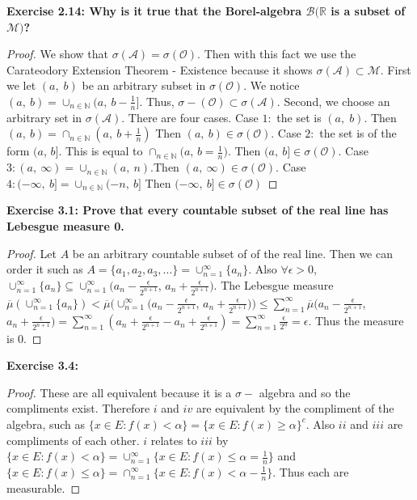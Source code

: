 \documentclass[letterpaper,12pt]{article}
\theoremstyle{definition}
\begin{document}
\noindent\textbf{ Exercise 2.14:
Why is it true that the Borel-algebra $\mathcal{B}(\mathbb{R}$ is a subset of $\mathcal{M})$?}
\begin{proof}
We show that $\sigma(\mathcal{A}) = \sigma(\mathcal{O})$.  Then with this fact we use the Carateodory Extension Theorem - Existence because it shows $\sigma(\mathcal{A}) \subset \mathcal{M}$.  First we let $(a,\;b)$ be an arbitrary subset in
 $\sigma(\mathcal{O})$.  We notice $(a, \:b) = \cup_{n \in \mathbb{N}}(a, \: b - \frac{1}{n}]$.  Thus, $\sigma-(\mathcal{O}) 
\subset \sigma(\mathcal{A})$.  Second, we choose an arbitrary set in $\sigma(\mathcal{A})$.  There are four cases.  Case 
$1:$ the set is $(a,\;b)$.  Then $(a,\:b) = \cap_{n \in \mathbb{N}}(a,\: b + \frac{1}{n})$ Then $(a, \:b) \in \sigma(\mathcal{O})$.  
Case $2:$ the set is of the form $(a$, $b]$.  This is equal to $ \cap_{n\in\mathbb{N}}(a$, $b = \frac{1}{n})$. Then $(a, \:b] \in \sigma(\mathcal{O})$. Case$3: (a,\:\infty) = \cup_{n\in\mathbb{N}}(a, \:n)$.Then $(a, \:\infty) \in \sigma(\mathcal{O})$. Case $4: (-\infty,\:b] = \cup_{n\in\mathbb{N}} (-n,\:b]$ Then $(-\infty, \:b] \in \sigma(\mathcal{O})$
\end{proof}

\noindent\textbf{ Exercise 3.1:
Prove that every countable subset of the real line has Lebesgue measure 0.}
\begin{proof}
Let $A$ be an arbitrary countable subset of of the real line.  Then we can order it such as $A = \{ a_1, a_2, a_3, \dots \} = \cup^{\infty}_{n=1} \{ a_n\}$.  Also $\forall \epsilon >  0$, $ \cup^{\infty}_{n=1} \{a_n\}  \subseteq \cup^{\infty}_{n=1}(a_n-\frac{\epsilon}{2^{n+1}}$, $a_n + \frac{\epsilon}{2^{n+1}})$.  The Lebesgue measure $\overline{\mu}(\cup_{n=1}^{\infty} \{a_n\}) < \overline{\mu}(\cup_{n=1}^{\infty} (a_n - \frac{\epsilon}{2^{n+1}}$, $a_n + \frac{\epsilon}{2^{n+1}} )) \leq \sum^{\infty}_{n=1} \overline{\mu} (a_n - \frac{\epsilon}{2^{n+1}}$, $a_n + \frac{\epsilon}{2^{n+1}} ) = \sum^{\infty}_{n=1} (a_n + \frac{\epsilon}{2^{n+1}} - a_n + \frac{\epsilon}{2^{n+1}}) = \sum^{\infty}_{n=1} \frac{\epsilon}{2^n} = \epsilon$.  Thus the measure is $0$.

\end{proof}

\noindent\textbf{ Exercise 3.4:}
\begin{proof}
 These are all equivalent because it is a $\sigma-$ algebra and so the compliments exist.  Therefore $i$ and $iv$ are equivalent by the compliment of the algebra, such as $\{ x \in E : f(x) < \alpha \} = \{ x \in E : f(x) \geq \alpha \}^c$.  Also $ii$ and $iii$ are compliments of each other. $i$ relates to $iii$ by $\{ x \in E : f(x) < \alpha \} = \cup^{\infty}_{n=1} \{ x \in E : f(x) \leq \alpha = \frac{1}{n} \}$ and $\{ x \in E : f(x) \leq \alpha \} = \cap_{n=1}^{\infty} \{ x \in E : f(x) < \alpha - \frac{1}{n} \}$. Thus each are measurable.

\end{proof}
\end{document}
